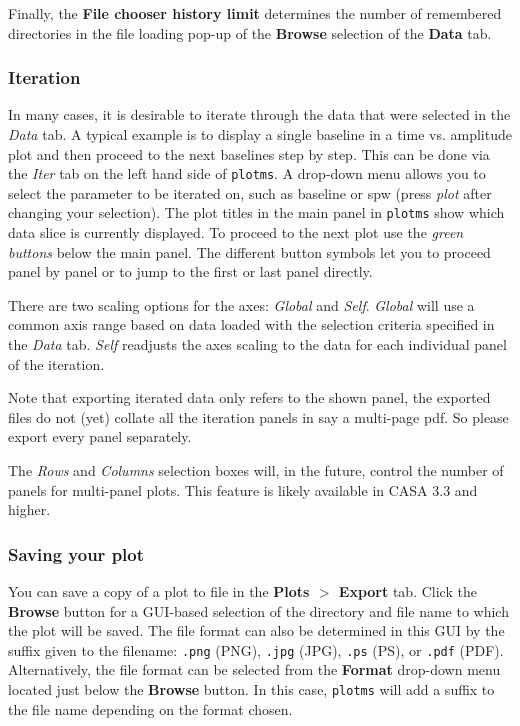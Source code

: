 Finally, the {\bf File chooser history limit} determines the number of
remembered directories in the file loading pop-up of the {\bf Browse}
selection of the {\bf Data} tab.


\subsubsection{Iteration}
\label{section:edit.plot.plotms.iter}

In many cases, it is desirable to iterate through the data that were
selected in the {\it Data} tab. A typical example is to display a single baseline in a time vs. amplitude plot and
then proceed to the next baselines step by step. This can be done via the {\it Iter} tab on the left hand
side of {\tt plotms}. A drop-down menu allows you to select the
parameter to be iterated on, such as baseline or spw (press {\it plot}
after changing your selection). The plot titles in the main panel in
{\tt plotms} show which data slice is currently displayed. To proceed
to the next plot use the {\it green buttons} below the main panel. The
different button symbols let you to proceed panel by panel or to jump to the first or last
panel directly.
 

There are two scaling options for the axes: {\it Global} and {\it
  Self}. {\it Global} will use a common axis range based on data
loaded with the selection criteria specified in the {\it Data}
tab. {\it Self} readjusts the axes scaling to the data for each
individual panel of the iteration. 


Note that exporting iterated data only refers to the
shown panel, the exported files do not (yet) collate all the iteration
panels in say a
multi-page pdf. So please export every panel separately.

The {\it Rows} and {\it Columns} selection boxes will, in the future, control the number of
panels for multi-panel plots. This feature is likely available in CASA
3.3 and higher.



\subsubsection{Saving your plot}
\label{section:edit.plot.plotms.save}

You can save a copy of a plot to file in the {\bf Plots $>$ Export} tab. Click the {\bf Browse} button for a GUI-based selection of the directory and file name to which the plot will be saved. The file format can also be determined in this GUI by the suffix given to the filename: {\tt .png} (PNG), {\tt .jpg} (JPG), {\tt .ps} (PS), or {\tt .pdf} (PDF). Alternatively, the file format can be selected from the {\bf Format} drop-down menu located just below the {\bf Browse} button. In this case, {\tt plotms} will add a suffix to the file name depending on the format chosen.

